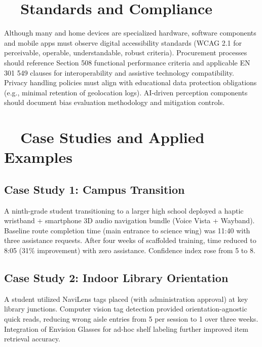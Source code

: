 \section{~~Standards and Compliance}\label{ch8:sec:standards-compliance}
Although many  and home devices are specialized hardware, software components and mobile apps must observe digital accessibility standards (WCAG 2.1 for perceivable, operable, understandable, robust criteria).\supercite{WCAG21W3C2018, WCAG20Caldwell2008, ISO40500} Procurement processes should reference Section 508 functional performance criteria and applicable EN 301 549 clauses for interoperability and assistive technology compatibility.\supercite{Section508, EN301549, USAccessBoard2018} Privacy handling policies must align with educational data protection obligations (e.g., minimal retention of geolocation logs). AI-driven perception components should document bias evaluation methodology and mitigation controls.\supercite{AI_Ethics_Bias, Bias_in_AI}

\section{~~Case Studies and Applied Examples}\label{ch8:sec:case-studies}

\subsection{Case Study 1: Campus Transition }
A ninth-grade student transitioning to a larger high school deployed a haptic wristband + smartphone 3D audio navigation bundle (Voice Vista + Wayband). Baseline route completion time (main entrance to science wing) was 11:40 with three assistance requests. After four weeks of scaffolded training, time reduced to 8:05 (31\% improvement) with zero assistance. Confidence index rose from 5 to 8.\supercite{AFBGPS2023, StudentOutcomesResearch}

\subsection{Case Study 2: Indoor Library Orientation}
A student utilized NaviLens tags placed (with administration approval) at key library junctions. Computer vision tag detection provided orientation-agnostic quick reads, reducing wrong aisle entries from 5 per session to 1 over three weeks. Integration of Envision Glasses for ad-hoc shelf labeling further improved item retrieval accuracy.\supercite{navilens, envision}

